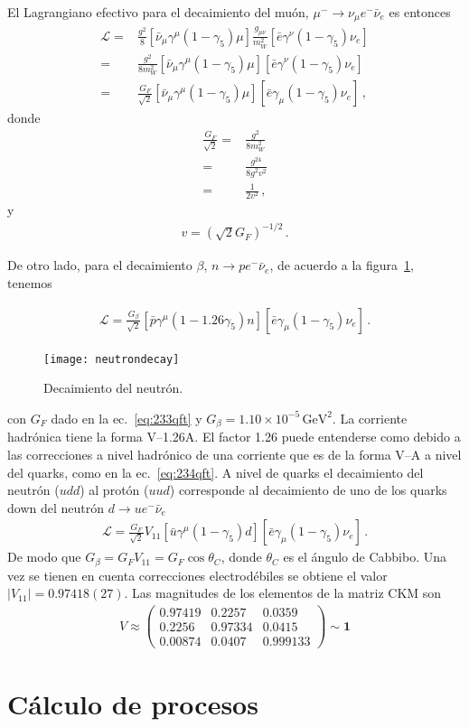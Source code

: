 El Lagrangiano efectivo para el decaimiento del muón, $\mu^-\to \nu_\mu e^- \bar{\nu}_e$ es entonces
\begin{align}
  \mathcal{L}=&\frac{g^2}{8}\left[\bar{\nu}_\mu\gamma^\mu(1-\gamma_5)\mu\right]\frac{g_{\mu\nu}}{m_W^2}
  \left[\bar{e}\gamma^\nu(1-\gamma_5)\nu_e\right]\nonumber\\
=&\frac{g^2}{8m_W^2}\left[\bar{\nu}_\mu\gamma^\mu(1-\gamma_5)\mu\right]
  \left[\bar{e}\gamma^\nu(1-\gamma_5)\nu_e\right]\nonumber\\
  =&\frac{G_F}{\sqrt{2}}\left[\bar{\nu}_\mu\gamma^\mu(1-\gamma_5)\mu\right]\left[\bar{e}\gamma_\mu(1-\gamma_5)\nu_e\right]\,,
\end{align}
donde
\begin{align}
  \frac{G_F}{\sqrt{2}}=&\frac{g^2}{8m_W^2}\nonumber\\
  =&\frac{g^24}{8g^2v^2}\nonumber\\
  =&\frac{1}{2v^2}\,,
\end{align}
y
\begin{align}
  v=\left(\sqrt{2}G_F\right)^{-1/2}\,.
\end{align}


De otro lado, para el  decaimiento $\beta$, $n\to p e^- \bar{\nu}_e$, de acuerdo a la figura~\ref{fig:neutrondecay}, tenemos

\begin{align}
    \mathcal{L}=\frac{G_\beta}{\sqrt{2}}\left[\bar{p}\gamma^\mu(1-1.26\gamma_5)n\right]\left[\bar{e}\gamma_\mu(1-\gamma_5)\nu_e\right]\,.
\end{align}
\begin{figure}
  \centering
  \texttt{[image: neutrondecay]}
  \caption{Decaimiento del neutrón.}
  \label{fig:neutrondecay}
\end{figure}
con $G_F$ dado en la ec.~\eqref{eq:233qft} y $G_\beta=1.10\times 10^{-5}\,\text{GeV}^2$. La corriente hadrónica tiene la forma V--1.26A. El factor 1.26  puede entenderse como debido a las correcciones a nivel hadrónico de una corriente que es de la forma V--A a nivel del quarks, como en la ec.~\eqref{eq:234qft}. A nivel de quarks el decaimiento del neutrón ($udd$) al protón ($uud$) corresponde al decaimiento de uno de los quarks down del neutrón $d\to u e^- \bar{\nu}_e$
\begin{align}
    \mathcal{L}=\frac{G_F}{\sqrt{2}}V_{11}\left[\bar{u}\gamma^\mu(1-\gamma_5)d\right]\left[\bar{e}\gamma_\mu(1-\gamma_5)\nu_e\right]\,.
\end{align}
De modo que $G_\beta=G_F V_{11}=G_F\cos\theta_C$, donde $\theta_C$ es el ángulo de Cabbibo. Una vez se tienen en cuenta correcciones electrodébiles se obtiene el valor $|V_{11}|=0.97418(27)$\cite{PDG}. Las magnitudes de los elementos de la matriz CKM son\cite{PDG}
\begin{align}
  V\approx\begin{pmatrix}
    0.97419&0.2257&0.0359\\
    0.2256&0.97334&0.0415\\
    0.00874&0.0407&0.999133
  \end{pmatrix}\sim \mathbf{1}
\end{align}

\section{Cálculo de procesos}

